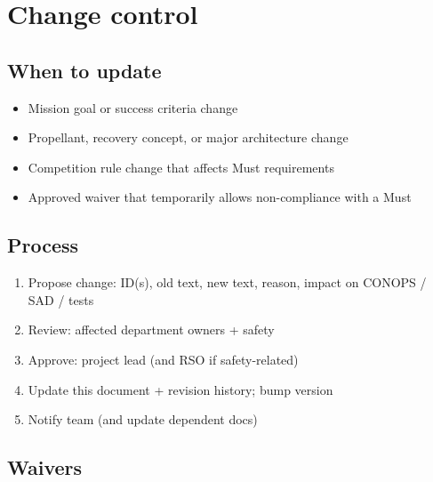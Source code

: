 \section{Change control}


\subsection{When to update}

\begin{itemize}
  \item Mission goal or success criteria change
  \item Propellant, recovery concept, or major architecture change
  \item Competition rule change that affects Must requirements
  \item Approved waiver that temporarily allows non-compliance with a Must
\end{itemize}

\subsection{Process}

\begin{enumerate}[leftmargin=*]
  \item Propose change: ID(s), old text, new text, reason, impact on CONOPS / SAD / tests
  \item Review: affected department owners + safety
  \item Approve: project lead (and RSO if safety-related)
  \item Update this document + revision history; bump version
  \item Notify team (and update dependent docs)
\end{enumerate}

\subsection{Waivers}


